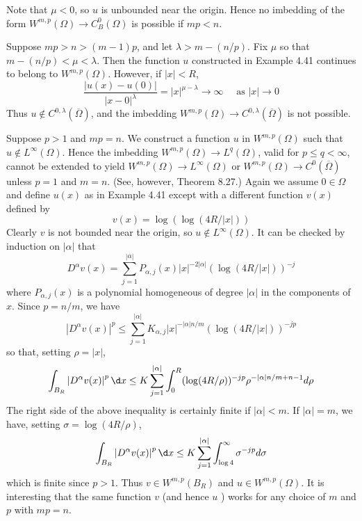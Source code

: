 Note that $\mu<0$, so $u$ is unbounded near the origin. Hence no imbedding of the form $W^{m,p}(\Omega) \rightarrow C_B^0(\Omega)$ is possible if $m p<n$.


\begin{example}
  Suppose $m p>n>(m-1) p$, and let $\lambda>m-(n / p)$. Fix $\mu$ so that $m-(n / p)<\mu<\lambda$. Then the function $u$ constructed in Example 4.41 continues to belong to $W^{m,p}(\Omega)$. However, if $|x|<R$,
  \[
  \frac{|u(x)-u(0)|}{|x-0|^\lambda}=|x|^{\mu-\lambda} \rightarrow \infty \quad \text { as }|x| \rightarrow 0
  \]
  Thus $u \notin C^{0, \lambda}(\overline{\Omega})$, and the imbedding $W^{m,p}(\Omega) \rightarrow C^{0, \lambda}(\overline{\Omega})$ is not possible.
\end{example}

\begin{example}
  Suppose $p>1$ and $m p=n$. We construct a function $u$ in $W^{m,p}(\Omega)$ such that
  $u \notin L^{\infty}(\Omega)$. Hence the imbedding $W^{m,p}(\Omega) \rightarrow L^q(\Omega)$,
  valid for $p \leq q<\infty$, cannot be extended to yield $W^{m,p}(\Omega) \rightarrow L^{\infty}(\Omega)$
  or $W^{m,p}(\Omega) \rightarrow C^0(\overline{\Omega})$ unless $p=1$ and $m=n$. (See, however, Theorem 8.27.)
  Again we assume $0 \in \Omega$ and define $u(x)$ as in Example 4.41 except with a different function $v(x)$ 
  defined by
  \[
  v(x)=\log (\log (4 R /|x|))
  \]
  Clearly $v$ is not bounded near the origin, so $u \notin L^{\infty}(\Omega)$. It can be checked by induction on $|\alpha|$ that
  \[
  D^\alpha v(x)=\sum_{j=1}^{|\alpha|} P_{\alpha, j}(x)|x|^{-2|\alpha|}(\log (4 R /|x|))^{-j}
  \]
  where $P_{\alpha, j}(x)$ is a polynomial homogeneous of degree $|\alpha|$ in the components of $x$.
  Since $p=n / m$, we have
  \[
  \left|D^\alpha v(x)\right|^p \leq \sum_{j=1}^{|\alpha|} K_{\alpha, j}|x|^{-|\alpha| n / m}(\log (4 R /|x|))^{-j p}
  \]
  so that, setting $\rho=|x|$,
  \[
  \int_{B_R}\left|D^\alpha v(x)\right|^p \d x \leq K \sum_{j=1}^{|\alpha|} \int_0^R(\log (4 R / \rho))^{-j p} \rho^{-|\alpha| n / m+n-1} d \rho
  \]
  The right side of the above inequality is certainly finite if $|\alpha|<m$. If $|\alpha|=m$, we have, setting $\sigma=\log (4 R / \rho)$,
  \[
  \int_{B_R}\left|D^\alpha v(x)\right|^p \d x \leq K \sum_{j=1}^{|\alpha|} \int_{\log 4}^{\infty} \sigma^{-j p} d \sigma
  \]
  which is finite since $p>1$. Thus $v \in W^{m,p}\left(B_R\right)$ and $u \in W^{m,p}(\Omega)$.
  It is interesting that the same function $v$ (and hence $u$ ) works for any choice of $m$ and $p$ with $m p=n$.
\end{example}

